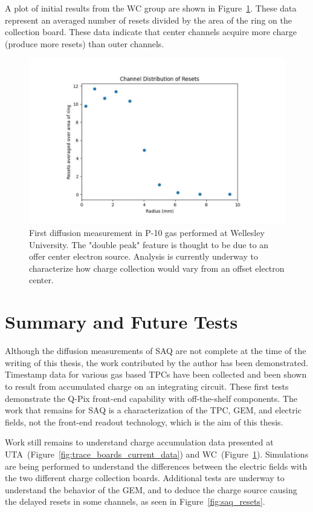 A plot of initial results from the WC group are shown in Figure~\ref{fig:saq_first_diffusion_measurement}.
These data represent an averaged number of resets divided by the area of the ring on the collection board.
These data indicate that center channels acquire more charge (produce more resets) than outer channels.

\begin{figure}[]
\centering
\includegraphics[width=\textwidth]{images/SAQ_first_diffusion_measurement.pdf}
\caption{First diffusion measurement in P-10 gas performed at Wellesley University.
The "double peak" feature is thought to be due to an offer center electron source.
Analysis is currently underway to characterize how charge collection would vary from an offset electron center.
}
\label{fig:saq_first_diffusion_measurement}
\end{figure}


\section{Summary and Future Tests}

Although the diffusion measurements of SAQ are not complete at the time of the writing of this thesis, the work contributed by the author has been demonstrated.
Timestamp data for various gas based TPCs have been collected and been shown to result from accumulated charge on an integrating circuit.
These first tests demonstrate the Q-Pix front-end capability with off-the-shelf components.
The work that remains for SAQ is a characterization of the TPC, GEM, and electric fields, not the front-end readout technology, which is the aim of this thesis.


Work still remains to understand charge accumulation data presented at UTA~(Figure~\ref{fig:trace_boards_current_data}) and WC~(Figure~\ref{fig:saq_first_diffusion_measurement}).
Simulations are being performed to understand the differences between the electric fields with the two different charge collection boards.
Additional tests are underway to understand the behavior of the GEM, and to deduce the charge source causing the delayed resets in some channels, as seen in Figure~\ref{fig:saq_resets}.

